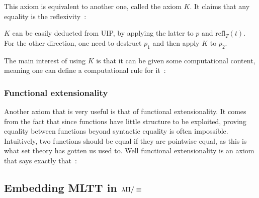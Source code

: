\begin{center}\begin{prooftree}
     
     
\end{prooftree}\end{center}

This axiom is equivalent to another one, called the axiom $K$. It claims that
any equality is the reflexivity~:

\begin{center}\begin{prooftree}
     
\end{prooftree}\end{center}

$K$ can be easily deducted from UIP, by applying the latter to $p$ and
$\text{refl}_{T}(t)$. For the other direction, one need to destruct $p_{1}$ and
then apply $K$ to $p_{2}$.

The main interest of using $K$ is that it can be given some computational
content, meaning one can define a computational rule for it~:

\begin{center}\begin{prooftree}
\end{prooftree}\end{center}

\subsubsection{Functional extensionality}\label{funext}

Another axiom that is very useful is that of functional extensionality. It comes
from the fact that since functions have little structure to be exploited,
proving equality between functions beyond syntactic equality is often
impossible. Intuitively, two functions should be equal if they are pointwise
equal, as this is what set theory has gotten us used to. Well functional
extensionality is an axiom that says exactly that~:

\begin{center}\begin{prooftree}
\end{prooftree}\end{center}

\subsection{Embedding MLTT in $\lp$}\label{mltt-shallow}

